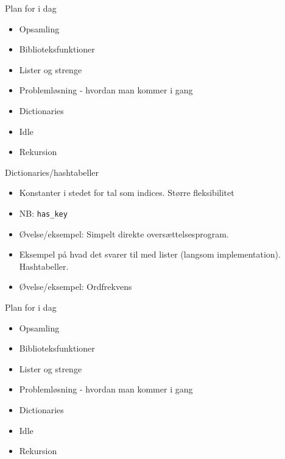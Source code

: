 \documentclass[a4paper,landscape]{slides}
\begin{document}
\begin{slide}
	\begin{center} {\large 
            Plan for i dag
	} \end{center}
	\begin{itemize} \addtolength{\itemsep}{-\baselineskip}
		\item Opsamling
		\item Biblioteksfunktioner
                \item Lister og strenge
		\item Problemløsning - hvordan man kommer i gang
                \item Dictionaries
		\item Idle
		\item Rekursion
	\end{itemize}
\end{slide}


\begin{slide}
	\begin{center} {\large 
            Dictionaries/hashtabeller
	} \end{center}
	\begin{itemize} \addtolength{\itemsep}{-\baselineskip}
		\item Konstanter i stedet for tal som indices. Større fleksibilitet
		\item NB: \verb|has_key|
                \item Øvelse/eksempel: Simpelt direkte oversættelsesprogram.
                \item Eksempel på hvad det svarer til med lister (langsom implementation). Hashtabeller.
                \item Øvelse/eksempel: Ordfrekvens
	\end{itemize}
\end{slide}

\begin{slide}
	\begin{center} {\large 
            Plan for i dag
	} \end{center}
	\begin{itemize} \addtolength{\itemsep}{-\baselineskip}
		\item Opsamling
		\item Biblioteksfunktioner
                \item Lister og strenge
		\item Problemløsning - hvordan man kommer i gang
                \item Dictionaries
		\item Idle
		\item Rekursion
	\end{itemize}
\end{slide}
\end{document}
